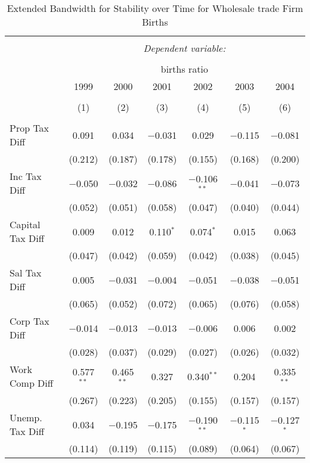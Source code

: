 
\begin{table}[!htbp] \centering 
  \caption{Extended Bandwidth for Stability over Time for  Wholesale trade Firm Births} 
  \label{42 ebyear} 
\small 
\begin{tabular}{@{\extracolsep{5pt}}lcccccc} 
\\[-1.8ex]\hline 
\hline \\[-1.8ex] 
 & \multicolumn{6}{c}{\textit{Dependent variable:}} \\ 
\cline{2-7} 
\\[-1.8ex] & \multicolumn{6}{c}{births ratio} \\ 
 & 1999 & 2000 & 2001 & 2002 & 2003 & 2004 \\ 
\\[-1.8ex] & (1) & (2) & (3) & (4) & (5) & (6)\\ 
\hline \\[-1.8ex] 
 Prop Tax Diff & 0.091 & 0.034 & $-$0.031 & 0.029 & $-$0.115 & $-$0.081 \\ 
  & (0.212) & (0.187) & (0.178) & (0.155) & (0.168) & (0.200) \\ 
  Inc Tax Diff & $-$0.050 & $-$0.032 & $-$0.086 & $-$0.106$^{**}$ & $-$0.041 & $-$0.073 \\ 
  & (0.052) & (0.051) & (0.058) & (0.047) & (0.040) & (0.044) \\ 
  Capital Tax Diff & 0.009 & 0.012 & 0.110$^{*}$ & 0.074$^{*}$ & 0.015 & 0.063 \\ 
  & (0.047) & (0.042) & (0.059) & (0.042) & (0.038) & (0.045) \\ 
  Sal Tax Diff & 0.005 & $-$0.031 & $-$0.004 & $-$0.051 & $-$0.038 & $-$0.051 \\ 
  & (0.065) & (0.052) & (0.072) & (0.065) & (0.076) & (0.058) \\ 
  Corp Tax Diff & $-$0.014 & $-$0.013 & $-$0.013 & $-$0.006 & 0.006 & 0.002 \\ 
  & (0.028) & (0.037) & (0.029) & (0.027) & (0.026) & (0.032) \\ 
  Work Comp Diff & 0.577$^{**}$ & 0.465$^{**}$ & 0.327 & 0.340$^{**}$ & 0.204 & 0.335$^{**}$ \\ 
  & (0.267) & (0.223) & (0.205) & (0.155) & (0.157) & (0.157) \\ 
  Unemp. Tax Diff & 0.034 & $-$0.195 & $-$0.175 & $-$0.190$^{**}$ & $-$0.115$^{*}$ & $-$0.127$^{*}$ \\ 
  & (0.114) & (0.119) & (0.115) & (0.089) & (0.064) & (0.067) \\ 

\end{tabular}
\end{table}

